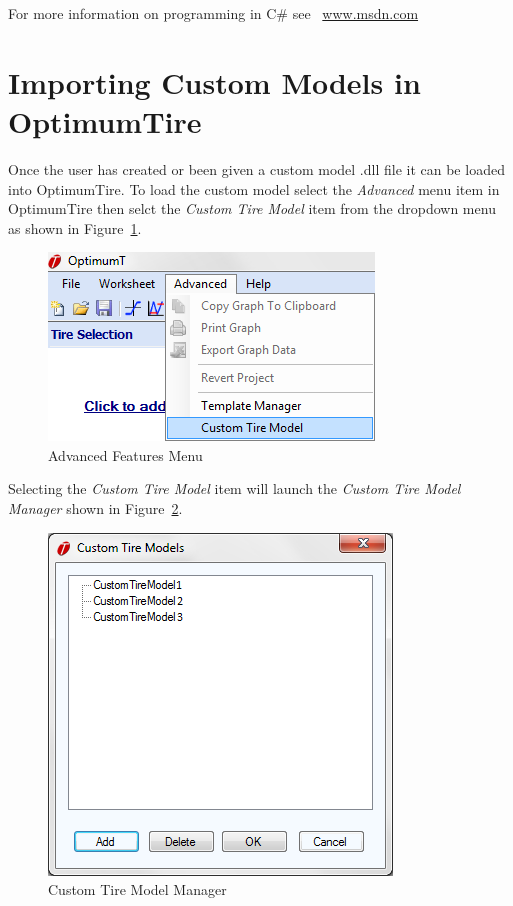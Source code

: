 For more information on programming in C\# see ~\href{http://www.msdn.com}{www.msdn.com}

\section{Importing Custom Models in OptimumTire}
\label{sec:ImportingCustomModelsinOptimumTire}

Once the user has created or been given a custom model .dll file it can be loaded into OptimumTire. To load the custom model select the \textsl{Advanced} menu item in OptimumTire then selct the \textsl{Custom Tire Model} item from the dropdown menu as shown in Figure~\ref{fig:AdvancedFeaturesMenu}.

\begin{figure}[H]
	\centering
		\includegraphics{AdvancedCustomTireModel.png}
	\caption{Advanced Features Menu}
	\label{fig:AdvancedFeaturesMenu}
\end{figure}

Selecting the \textsl{Custom Tire Model} item will launch the \textsl{Custom Tire Model Manager} shown in Figure~\ref{fig:CustomTireModelManager}.

 \begin{figure}[H]
	\centering
		\includegraphics{CustomTireModelManager.png}
	\caption{Custom Tire Model Manager}
	\label{fig:CustomTireModelManager}
\end{figure}

